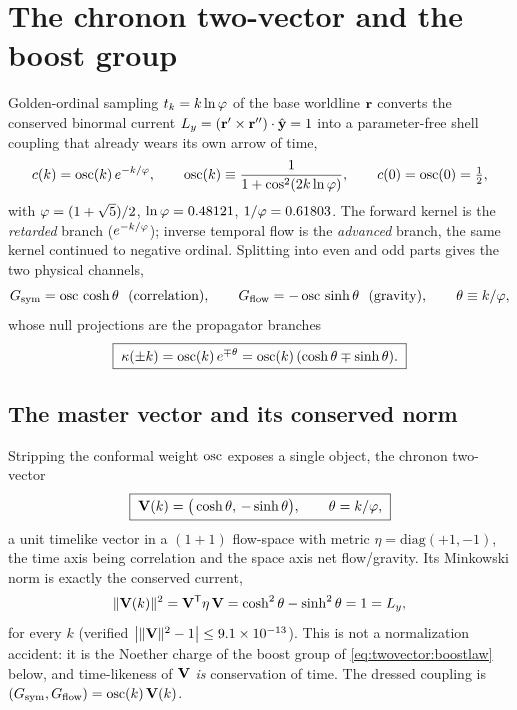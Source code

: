 \section{The chronon two-vector and the boost group}
\label{sec:twovector}

Golden-ordinal sampling $t_k=k\ln\varphi$ of the base worldline $\mathbf{r}$ converts the conserved
binormal current $L_{y}=(\mathbf r'\times\mathbf r'')\cdot\hat{\mathbf y}=1$ into a
parameter-free shell coupling that already wears its own arrow of time,
\begin{equation}
c(k)=\operatorname{osc}(k)\,e^{-k/\varphi},\qquad
\operatorname{osc}(k)\equiv\frac{1}{1+\cos^2(2k\ln\varphi)},\qquad c(0)=\operatorname{osc}(0)=\tfrac12,
\label{eq:twovector:ckappa}
\end{equation}
with $\varphi=(1+\sqrt5)/2$, $\ln\varphi=0.48121$, $1/\varphi=0.61803$. The forward kernel is
the \emph{retarded} branch ($e^{-k/\varphi}$); inverse temporal flow is the
\emph{advanced} branch, the same kernel continued to negative ordinal. Splitting into
even and odd parts gives the two physical channels,
\begin{equation}
\Gsym=\osc\,\cosh\rap\ \ (\text{correlation}),\qquad
\Gflow=-\osc\,\sinh\rap\ \ (\text{gravity}),\qquad \rap\equiv k/\phigr,
\label{eq:twovector:GsymGflow}
\end{equation}
whose null projections are the propagator branches
\begin{equation}
\boxed{\;\kappa(\pm k)=\operatorname{osc}(k)\,e^{\mp\theta}=\operatorname{osc}(k)\,(\cosh\theta\mp\sinh\theta).\;}
\label{eq:twovector:nullsplit}
\end{equation}

\subsection{The master vector and its conserved norm}

Stripping the conformal weight $\operatorname{osc}$ exposes a single object, the chronon two-vector
\begin{equation}
\boxed{\;\mathbf{V}(k)=\big(\cosh\theta,\,-\sinh\theta\big),\qquad \theta=k/\varphi,\;}
\label{eq:twovector:V}
\end{equation}
a unit timelike vector in a $(1{+}1)$ flow-space with metric $\eta=\mathrm{diag}(+1,-1)$,
the time axis being correlation and the space axis net flow/gravity. Its Minkowski norm is
exactly the conserved current,
\begin{equation}
\|\mathbf{V}(k)\|^2=\mathbf{V}^{\mathsf T}\eta\,\mathbf{V}=\cosh^2\theta-\sinh^2\theta=1=L_{y},
\label{eq:twovector:norm}
\end{equation}
for every $k$ (verified $\big|\|\mathbf{V}\|^2-1\big|\le9.1\times10^{-13}$). This is not a
normalization accident: it is the Noether charge of the boost group of
\eqref{eq:twovector:boostlaw} below, and time-likeness of $\mathbf{V}$ \emph{is} conservation
of time. The dressed coupling is $(G_{\mathrm{sym}},G_{\mathrm{flow}})=\operatorname{osc}(k)\,\mathbf{V}(k)$.

